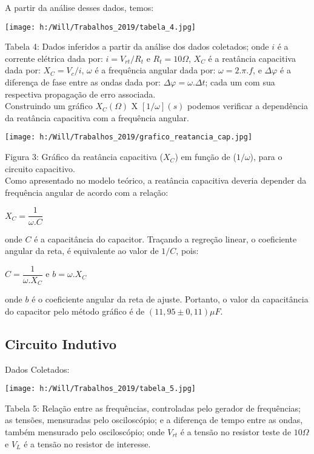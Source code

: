 \documentclass[a4paper, 12pt]{article}
\begin{document}
\begin{multicols}{2}
A partir da análise desses dados, temos:
\begin{center}
\begingroup
    \centering
    \texttt{[image: h:/Will/Trabalhos\_2019/tabela\_4.jpg]}
\endgroup
\end{center}
Tabela 4: Dados inferidos a partir da análise dos dados coletados; onde $i$ é a corrente elétrica dada por: $i=V_{rt}/R_{t}$ e $R_{t}=10\Omega$, $X_{C}$ é a reatância capacitiva dada por: $X_{C}=V_{c}/i$, $\omega$ é a frequência angular dada por: $\omega=2.\pi . f$, e $\Delta \varphi$ é a diferença de fase entre as ondas dada por: $\Delta \varphi=\omega . \Delta t$; cada um com sua respectiva propagação de erro associada. \\

Construindo um gráfico $X_{C}(\Omega)$ X $[1/ \omega] (s)$ podemos verificar a dependência da reatância capacitiva com a frequência angular.
\begin{center}
\begingroup
    \centering
    \texttt{[image: h:/Will/Trabalhos\_2019/grafico\_reatancia\_cap.jpg]}
\endgroup
\end{center}
Figura 3: Gráfico da reatância capacitiva ($X_{C}$) em função de ($1/ \omega$), para o circuito capacitivo. \\

Como apresentado no modelo teórico, a reatância capacitiva deveria depender da frequência angular de acordo com a relação:
\begin{center}
$X_{C}=\dfrac{1}{\omega .C}$
\end{center} 
onde $C$ é a capacitância do capacitor. Traçando a regreção linear, o coeficiente angular da reta, é equivalente ao valor de $1/C$, pois:
\begin{center}
$C=\dfrac{1}{\omega .X_{C}}$ e $b=\omega .X_{C}$
\end{center} 
onde $b$ é o coeficiente angular da reta de ajuste. Portanto, o valor da capacitância do capacitor pelo método gráfico é de $(11,95 \pm 0,11) \mu F$.

\subsection{Circuito Indutivo}
Dados Coletados:
\begin{center}
\begingroup
    \centering
    \texttt{[image: h:/Will/Trabalhos\_2019/tabela\_5.jpg]}
\endgroup
\end{center}
Tabela 5: Relação entre as frequências, controladas pelo gerador de frequências; as tensões, mensuradas pelo osciloscópio; e a diferença de tempo entre as ondas, também mensurado pelo osciloscópio; onde $V_{rt}$ é a tensão no resistor teste de $10 \Omega$ e $V_{L}$ é a tensão no resistor de interesse. \\


\end{multicols}
\end{document}
